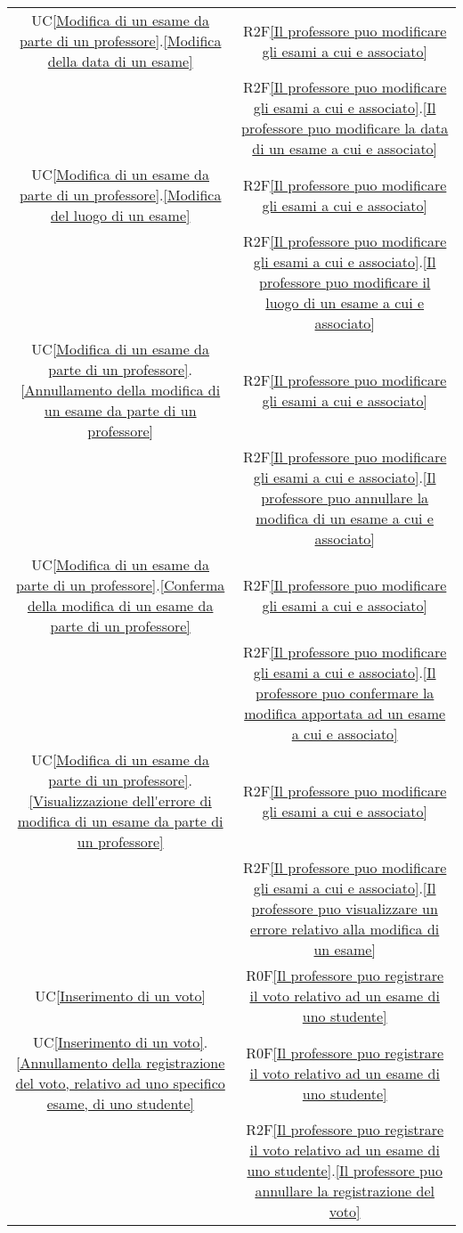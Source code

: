 \begin{longtable}{|c|c|}
\hline
UC\ref{Modifica di un esame da parte di un professore}.\ref{Modifica della data di un esame} & R2F\ref{Il professore puo modificare gli esami a cui e associato}\\
& R2F\ref{Il professore puo modificare gli esami a cui e associato}.\ref{Il professore puo modificare la data di un esame a cui e associato}\\
\hline
UC\ref{Modifica di un esame da parte di un professore}.\ref{Modifica del luogo di un esame} & R2F\ref{Il professore puo modificare gli esami a cui e associato}\\
& R2F\ref{Il professore puo modificare gli esami a cui e associato}.\ref{Il professore puo modificare il luogo di un esame a cui e associato}\\
\hline
UC\ref{Modifica di un esame da parte di un professore}.\ref{Annullamento della modifica di un esame da parte di un professore} & R2F\ref{Il professore puo modificare gli esami a cui e associato}\\
& R2F\ref{Il professore puo modificare gli esami a cui e associato}.\ref{Il professore puo annullare la modifica di un esame a cui e associato}\\
\hline
UC\ref{Modifica di un esame da parte di un professore}.\ref{Conferma della modifica di un esame da parte di un professore} & R2F\ref{Il professore puo modificare gli esami a cui e associato}\\
& R2F\ref{Il professore puo modificare gli esami a cui e associato}.\ref{Il professore puo confermare la modifica apportata ad un esame a cui e associato}\\
\hline
 UC\ref{Modifica di un esame da parte di un professore}.\ref{Visualizzazione dell'errore di modifica di un esame da parte di un professore} & R2F\ref{Il professore puo modificare gli esami a cui e associato}\\
& R2F\ref{Il professore puo modificare gli esami a cui e associato}.\ref{Il professore puo visualizzare un errore relativo alla modifica di un esame}\\
\hline
UC\ref{Inserimento di un voto} & R0F\ref{Il professore puo registrare il voto relativo ad un esame di uno studente}\\
\hline
UC\ref{Inserimento di un voto}.\ref{Annullamento della registrazione del voto, relativo ad uno specifico esame, di uno studente} & R0F\ref{Il professore puo registrare il voto relativo ad un esame di uno studente}\\
& R2F\ref{Il professore puo registrare il voto relativo ad un esame di uno studente}.\ref{Il professore puo annullare la registrazione del voto}\\

\end{longtable}
